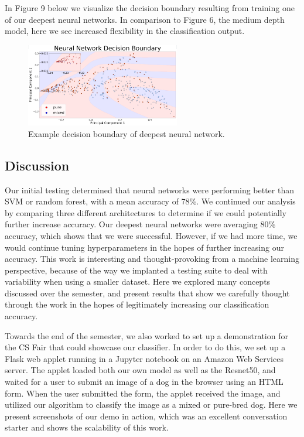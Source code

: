 \documentclass[12pt]{article}
\begin{document}
In Figure 9 below we visualize the decision boundary resulting from training one of our deepest neural networks. In comparison to Figure 6, the medium depth model, here we see increased flexibility in the classification output.

\begin{figure}[H]
\centering
\includegraphics[width=0.6\textwidth]{updatedboundary}
\caption{Example decision boundary of deepest neural network.}
\end{figure}


\subsection{Discussion}

Our initial testing determined that neural networks were performing better than SVM or random forest, with a mean accuracy of 78\%. We continued our analysis by comparing three different architectures to determine if we could potentially further increase accuracy. Our deepest neural networks were averaging 80\% accuracy, which shows that we were successful. However, if we had more time, we would continue tuning hyperparameters in the hopes of further increasing our accuracy. This work is interesting and thought-provoking from a machine learning perspective, because of the way we implanted a testing suite to deal with variability when using a smaller dataset. Here we explored many concepts discussed over the semester, and present results that show we carefully thought through the work in the hopes of legitimately increasing our classification accuracy. 

Towards the end of the semester, we also worked to set up a demonstration for the CS Fair that could showcase our classifier. In order to do this, we set up a Flask web applet running in a Jupyter notebook on an Amazon Web Services server. The applet loaded both our own model as well as the Resnet50, and waited for a user to submit an image of a dog in the browser using an HTML form. When the user submitted the form, the applet received the image, and utilized our algorithm to classify the image as a mixed or pure-bred dog. Here we present screenshots of our demo in action, which was an excellent conversation starter and shows the scalability of this work. 
\end{document}
